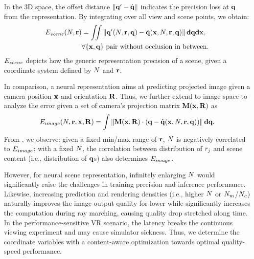 In the 3D space, the offset distance $\left\lVert\mathbf{q}^\prime-\hat{\mathbf{q}}\right\rVert$ indicates the precision loss at $\mathbf{q}$ from the representation. By integrating over all view and scene points, we obtain:
\begin{equation}
\begin{aligned}
E_{scene}(N, \mathbf{r})  &= \iint \left\lVert\mathbf{q}^\prime(N,\mathbf{r},\mathbf{q})-\hat{\mathbf{q}}(\mathbf{x},N, \mathbf{r},\mathbf{q})\right\rVert \mathbf{d}\mathbf{q} \mathbf{d}\mathbf{x},\\
&\forall \{\mathbf{x}, \mathbf{q}\} \text{ pair without occlusion in between}.
\label{eq:sparseError}
\end{aligned}
\end{equation}
$E_{scene}$ depicts how the generic representation precision of a scene, given a coordinate system defined by $N$ and $\mathbf{r}$.

In comparison, a neural representation aims at predicting projected image given a camera position $\mathbf{x}$ and orientation $\mathbf{R}$. Thus, we further extend  to image space to analyze the error given a set of camera's projection matrix  $\mathbf{M}(\mathbf{x},\mathbf{R})$ as
\begin{align}
E_{image}(N, \mathbf{r}, \mathbf{x}, \mathbf{R})  = \int \left\lVert\mathbf{M}(\mathbf{x},\mathbf{R})\cdot\left(\mathbf{q}-
\hat{\mathbf{q}}(\mathbf{x},N, \mathbf{r},\mathbf{q})\right)\right\rVert\mathbf{d}\mathbf{q}.
\label{eq:imageError}
\end{align}
From , we observe:
given a fixed min/max range of $\mathbf{r}$, $N$ is negatively correlated to $E_{image}$;
with a fixed $N$, the correlation between distribution of $r_j$ and scene content (i.e., distribution of $\mathbf{q}$s) also determines $E_{image}$.

However, for neural scene representation, infinitely enlarging $N$ would significantly raise the challenges in training precision and inference performance.
Likewise, increasing prediction and rendering densities (i.e., higher $N$ or $N_{m}$/$N_{c}$) naturally improves the image output quality for lower  while significantly increases the computation during ray marching, causing quality drop stretched along time. In the performance-sensitive VR scenario, the latency breaks the continuous viewing experiment and may cause simulator sickness. Thus, we determine the coordinate variables with a content-aware optimization towards optimal quality-speed performance.

